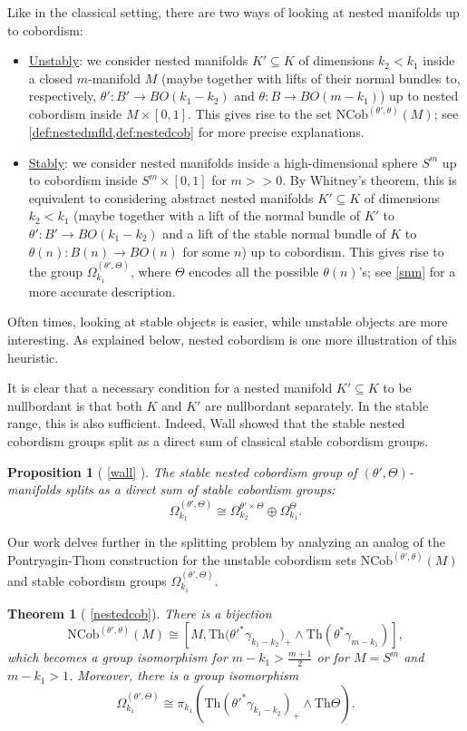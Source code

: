 \documentclass[a4paper, 11pt,reqno]{amsart}
\theoremstyle{plain}
\newtheorem*{theorem*}{Theorem}
\newtheorem*{proposition*}{Proposition}
\theoremstyle{definition}
\newcommand{\Th}{\mathrm{Th}}
\begin{document}
Like in the classical setting, there are two ways of looking at nested manifolds up to cobordism:
\begin{itemize}
    \item \underline{Unstably}: we consider nested manifolds $K'\subseteq K$ of dimensions $k_2< k_1$ inside a closed $m$-manifold $M$ (maybe together with lifts of their normal bundles to, respectively,  $\theta'\colon B'\to BO(k_1-k_2)$ and $\theta\colon B\to BO(m-k_1)$) up to nested cobordism inside $M\times[0,1]$. This gives rise to the set $\mathrm{NCob}^{(\theta',\theta)}(M)$; see \cref{def:nestedmfld,def:nestedcob} for more precise explanations.
    \item \underline{Stably}: we consider nested manifolds inside a high-dimensional sphere $S^m$ up to cobordism inside $S^m\times[0,1]$ for $m>>0$. By Whitney's theorem, this is equivalent to considering abstract nested manifolds $K'\subseteq K$ of dimensions $k_2< k_1$ (maybe together with a lift of the normal bundle of $K'$ to $\theta'\colon B'\to BO(k_1-k_2)$ and a lift of the stable normal bundle of $K$ to $\theta(n)\colon B(n)\to BO(n)$ for some $n$) up to cobordism. This gives rise to the group $\Omega_{k_1}^{(\theta',\Theta)}$, where $\Theta$ encodes all the possible $\theta(n)$'s; see \cref{snm} for a more accurate description. 
\end{itemize}
Often times, looking at stable objects is easier, while unstable objects are more interesting. As explained below, nested cobordism is one more illustration of this heuristic.\par 
It is clear that a necessary condition for a nested manifold $K'\subseteq K$ to be nullbordant is that both $K$ and $K'$ are nullbordant separately. In the stable range, this is also sufficient. Indeed, Wall showed that the stable nested cobordism groups split as a direct sum of classical stable cobordism groups.
\begin{proposition*}[{ \ref{wall} \cite[Lemma 8.3.5]{Wallbook}}] The stable nested cobordism group of $(\theta',\Theta)$-manifolds splits as a direct sum of stable cobordism groups:
    \[\Omega_{k_1}^{(\theta',\Theta)}\cong\Omega_{k_2}^{\theta'\times\Theta}\oplus\Omega_{k_1}^{\Theta}.\]\end{proposition*}
Our work delves further in the splitting problem by analyzing an analog of the Pontryagin-Thom construction for the unstable cobordism sets $\mathrm{NCob}^{(\theta',\theta)}(M)$ and stable cobordism groups $\Omega_{k_1}^{(\theta',\Theta)}$.
\begin{theorem*}[ \ref{nestedcob}] There is a bijection
\[
    \mathrm{NCob}^{(\theta',\theta)}(M)\cong[M,{\Th(\theta'^\ast\gamma_{k_1-k_2}})_+\wedge \Th(\theta^\ast\gamma_{m-k_1})],\]
which becomes a group isomorphism for $m-k_1>\frac{m+1}{2}$ or for $M=S^m$ and $m-k_1>1$. Moreover, there is a group isomorphism
\[\Omega_{k_1}^{(\theta',\Theta)}\cong\pi_{k_1}({\Th(\theta'^\ast\gamma_{k_1-k_2})}_+\wedge \Th\Theta). \]
\end{theorem*}
\end{document}

